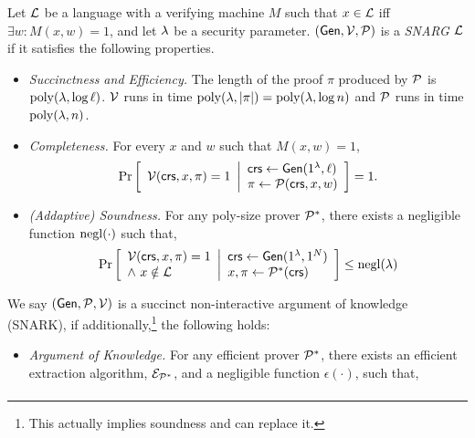 \begin{definition} \label{def:snarg}
Let $\mathcal{L}$ be a language with a verifying machine $M$ such that $x \in \mathcal{L}$ iff $\exists w: M(x,w)=1$, and let $\lambda$ be a security parameter. $(\mathsf{Gen}, \mathcal{V}, \mathcal{P})$ is a \emph{SNARG $\mathcal{L}$}
if it satisfies the following properties.
\begin{itemize}
    \item \emph{Succinctness and Efficiency.} The length of the proof $\pi$ produced by $\mathcal{P}$ is $\operatorname{poly}(\lambda, \log \ell)$.
    $\mathcal{V}$ runs in time $\operatorname{poly}(\lambda, |\pi|) = \operatorname{poly}(\lambda, \log n)$
    and $\mathcal{P}$ runs in time $\operatorname{poly}(\lambda, n)$.
    \item \emph{Completeness. } For every $x$ and $w$ such that $M(x,w)=1$,
    \begin{gather*}
        \underset{}{\text{Pr}}\left [ 
        \begin{array}{ll}
        \mathcal{V}(\mathsf{crs}, x, \pi) = 1
        \end{array}
        \middle\vert
        \begin{array}{ll}
        \mathit{ \mathsf{crs} } \leftarrow \mathsf{Gen}(1^\lambda, \ell) \\
        \pi \leftarrow \mathcal{P}(\mathit{ \mathsf{crs} }, x, w) \\
        \end{array}
        \right ] = 1
	.
    \end{gather*}
    \item \emph{(Addaptive) Soundness. }
    For any poly-size prover $\mathcal{P}^*$, there exists a negligible function $\operatorname{negl}(\cdot)$ such that,
    \begin{gather*}
        \Pr \left[ \begin{array}{ll} 
        \mathcal{V}(\mathsf{crs}, x, \pi) = 1 \\
        \wedge ~ x\notin \mathcal{L}
         \end{array} \middle\vert \begin{array}{ll} 
        \mathsf{crs} \leftarrow \mathsf{Gen}(1^\lambda, 1^N) \\
        x, \pi \leftarrow \mathcal{P}^*(\mathsf{crs})
         \end{array} \right] \leq \operatorname{negl}(\lambda)
    \end{gather*}
\end{itemize}
We say $(\mathsf{Gen}, \mathcal{P}, \mathcal{V})$ is a succinct non-interactive argument of knowledge (SNARK), if additionally,\footnote{This actually implies soundness and can replace it.} the following holds:
\begin{itemize}
    \item \emph{Argument of Knowledge.} For any efficient prover $\mathcal{P}^*$, there exists an efficient extraction algorithm, $\mathcal{E}_{\mathcal{P}^*}$, and a negligible function $\epsilon(\cdot)$, such that,
    \begin{gather*}

\end{gather*}
\end{itemize}
\end{definition}

